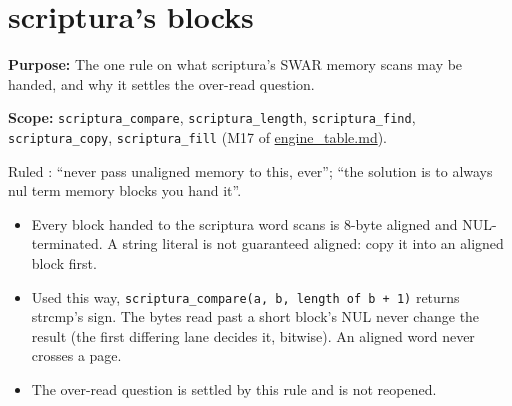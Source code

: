 \chapter{\texorpdfstring{scriptura's blocks}{scriptura's blocks}}
\label{chap:scriptura-blocks}

\textbf{Purpose:} The one rule on what scriptura's SWAR memory scans may be handed, and why it settles the over-read question.

\textbf{Scope:} \texttt{scriptura\_\allowbreak{}compare}, \texttt{scriptura\_\allowbreak{}length}, \texttt{scriptura\_\allowbreak{}find}, \texttt{scriptura\_\allowbreak{}copy}, \texttt{scriptura\_\allowbreak{}fill} (M17 of \hyperref[chap:engine-table]{engine\_\allowbreak{}table.md}).

Ruled : “never pass unaligned memory to this, ever”; “the solution is to always nul term memory blocks you hand it”.

\begin{itemize}
\item Every block handed to the scriptura word scans is 8-byte aligned and NUL-terminated. A string literal is not guaranteed aligned: copy it into an aligned block first.
\item Used this way, \texttt{scriptura\_\allowbreak{}compare(a, b, length of b + 1)} returns strcmp's sign. The bytes read past a short block's NUL never change the result (the first differing lane decides it, bitwise). An aligned word never crosses a page.
\item The over-read question is settled by this rule and is not reopened.
\end{itemize}

